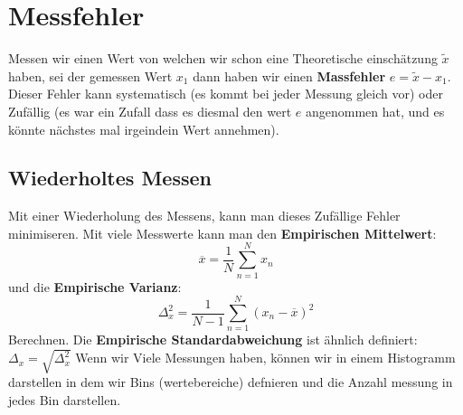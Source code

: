 \documentclass{article}
\begin{document}
\hypertarget{messfehler}{\section*{Messfehler}}
{Messen} wir einen Wert von welchen wir schon eine Theoretische einschätzung $\tilde{x}$ haben, sei der gemessen Wert $x_1$ dann haben wir einen \textbf{Massfehler} $e=\tilde{x}-x_1$.
Dieser Fehler kann systematisch (es kommt bei jeder Messung gleich vor) oder Zufällig (es war ein Zufall dass es diesmal den wert $e$ angenommen hat, und es könnte nächstes mal irgeindein Wert annehmen).
\hypertarget{PDF}{\subsection*{Wiederholtes Messen}}
Mit einer Wiederholung des Messens, kann man dieses Zufällige Fehler minimiseren. Mit viele Messwerte kann man den \textbf{Empirischen Mittelwert}:
\[\overline{x}=\frac{1}{N}\sum_{n=1}^N x_n\] und die \textbf{Empirische Varianz}:\[\Delta_x^2=\frac{1}{N-1}\sum_{n=1}^N(x_n-\overline{x})^2\]Berechnen. Die \textbf{Empirische Standardabweichung} ist ähnlich definiert: $\Delta_x=\sqrt{\Delta_x^2}$
\newline Wenn wir Viele Messungen haben, können wir in einem Histogramm darstellen in dem wir Bins (wertebereiche) defnieren und die Anzahl messung in jedes Bin darstellen.
\end{document}
